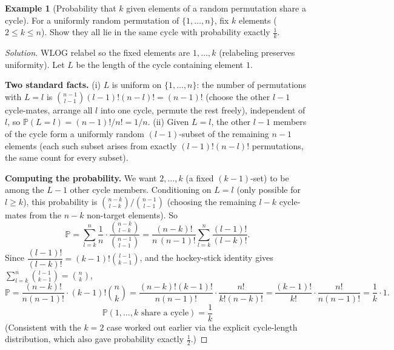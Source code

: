 \documentclass[11pt]{article}
\theoremstyle{definition}
\newtheorem{example}{Example}[section]
\begin{document}
\begin{example}[Probability that $k$ given elements of a random permutation share a cycle]
For a uniformly random permutation of $\{1,\dots,n\}$, fix $k$ elements ($2\le k\le n$). Show they all lie in the same cycle with probability exactly $\tfrac1k$.
\end{example}
\begin{proof}[Solution]
WLOG relabel so the fixed elements are $1,\dots,k$ (relabeling preserves uniformity). Let $L$ be the length of the cycle containing element $1$.

\textbf{Two standard facts.} (i) $L$ is uniform on $\{1,\dots,n\}$: the number of permutations with $L=l$ is $\binom{n-1}{l-1}(l-1)!(n-l)!=(n-1)!$ (choose the other $l-1$ cycle-mates, arrange all $l$ into one cycle, permute the rest freely), independent of $l$, so $\mathbb P(L=l)=(n-1)!/n!=1/n$. (ii) Given $L=l$, the other $l-1$ members of the cycle form a uniformly random $(l-1)$-subset of the remaining $n-1$ elements (each such subset arises from exactly $(l-1)!(n-l)!$ permutations, the same count for every subset).

\textbf{Computing the probability.} We want $2,\dots,k$ (a fixed $(k-1)$-set) to be among the $L-1$ other cycle members. Conditioning on $L=l$ (only possible for $l\ge k$), this probability is $\binom{n-k}{l-k}/\binom{n-1}{l-1}$ (choosing the remaining $l-k$ cycle-mates from the $n-k$ non-target elements). So
\[
\mathbb P=\sum_{l=k}^n\frac1n\cdot\frac{\binom{n-k}{l-k}}{\binom{n-1}{l-1}}=\frac{(n-k)!}{n\,(n-1)!}\sum_{l=k}^n\frac{(l-1)!}{(l-k)!}.
\]
Since $\dfrac{(l-1)!}{(l-k)!}=(k-1)!\binom{l-1}{k-1}$, and the hockey-stick identity gives $\sum_{l=k}^n\binom{l-1}{k-1}=\binom nk$,
\[
\mathbb P=\frac{(n-k)!}{n(n-1)!}\cdot(k-1)!\binom nk=\frac{(n-k)!(k-1)!}{n(n-1)!}\cdot\frac{n!}{k!(n-k)!}=\frac{(k-1)!}{k!}\cdot\frac{n!}{n(n-1)!}=\frac1k\cdot1.
\]
\[
\boxed{\mathbb P(1,\dots,k\text{ share a cycle})=\frac1k}
\]
(Consistent with the $k=2$ case worked out earlier via the explicit cycle-length distribution, which also gave probability exactly $\tfrac12$.)
\end{proof}
\end{document}
